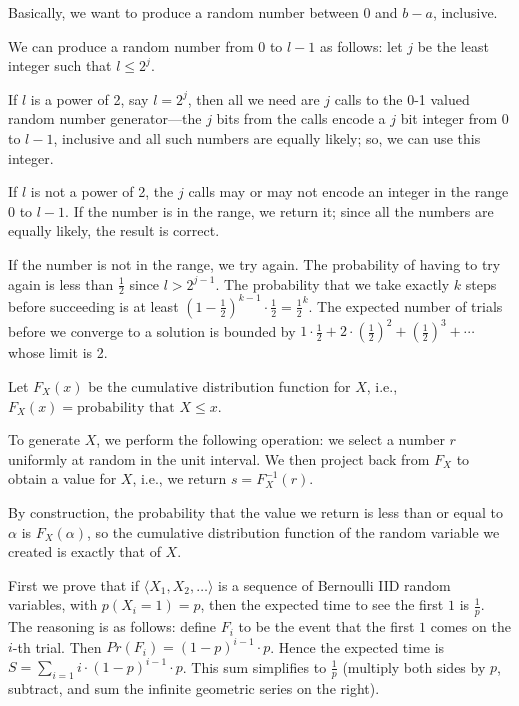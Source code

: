 Basically, we want to produce a random number between $0$ and $b-a$, inclusive.

We can produce a random number from $0$ to $l-1$ as follows: let $j$ be the least
integer such that $l\leq 2^j$. 

If $l$ is a power of 2, say $l=2^j$, then all we need are $j$ calls to the 0-1 valued
random number generator---the $j$ bits from the calls encode a $j$ bit integer
from $0$ to $l-1$, inclusive and all such numbers are equally likely;
so, we can use this integer.

If $l$ is not a power of 2, the $j$ calls may or may not encode an integer in the range
$0$ to $l-1$. If the number is in the range, we return it; since all the numbers
are equally likely, the result is correct. 

If the number is not in the range, we try again. The probability of having to try again
is less than $\frac{1}{2}$ since $l > 2^{j-1}$. 
The probability that we take exactly $k$ steps before succeeding
is at least $(1 - \frac{1}{2})^{k-1}\cdot \frac{1}{2} = \frac{1}{2}^k$.
The expected number of trials
before we converge to a solution is bounded by $1\cdot\frac{1}{2} + 2\cdot(\frac{1}{2})^2 + 
(\frac{1}{2})^3 + \cdots $ whose limit is 2.

Let $F_X(x)$ be the cumulative distribution function for $X$, 
i.e., $F_X(x) = \mbox{probability that } X \leq x$.  

To generate $X$, we perform the following operation: we select a number $r$ uniformly
at random in the unit interval. We then project back from $F_X$ to obtain a value
for $X$, i.e., we return $s = F_X^{-1}(r)$. 

By construction, the probability that the value we return is less than or equal to $\alpha$ is
$F_X(\alpha)$, so the cumulative distribution function of the random variable we
created is exactly that of $X$. 

First we prove that if $\langle X_1, X_2,\ldots \rangle$ is a sequence of Bernoulli IID random variables, with $p(X_i = 1) = p$,
then the expected time to see the first $1$ is $\frac{1}{p}$. The reasoning is as follows: define $F_i$ to
be the event that the first $1$ comes on the $i$-th trial. Then $Pr(F_i) = (1-p)^{i-1} \cdot p$.
Hence the expected time is $S = \sum_{i=1} i \cdot  (1-p)^{i-1} \cdot p$. This sum simplifies to $\frac{1}{p}$ (multiply
both sides by $p$, subtract, and sum the infinite geometric series on the right).

